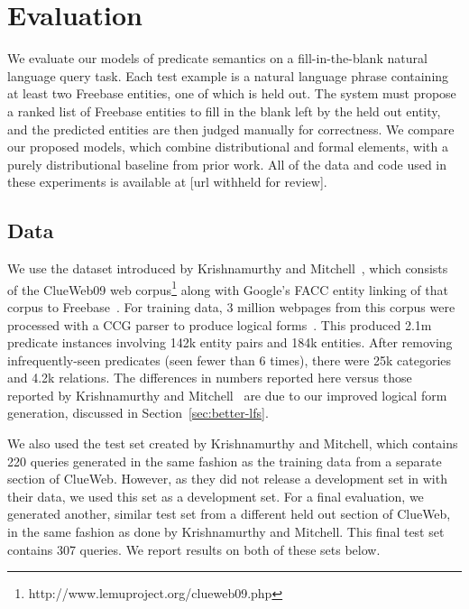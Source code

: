 \documentclass[11pt]{article}
\newcommand{\secref}[1]{Section~\ref{sec:#1}}
\begin{document}
\section{Evaluation}
\label{sec:evaluation}

We evaluate our models of predicate semantics on a fill-in-the-blank
natural language query task.  Each test example is a natural language
phrase containing at least two Freebase entities, one of which is held
out.  The system must propose a ranked list of Freebase entities to
fill in the blank left by the held out entity, and the predicted
entities are then judged manually for correctness.  We compare our
proposed models, which combine distributional and formal elements,
with a purely distributional baseline from prior work.  All of the
data and code used in these experiments is available at [url withheld
for review].

\subsection{Data}

We use the dataset introduced by Krishnamurthy and
Mitchell~,
which consists of the ClueWeb09 web
corpus\footnote{http://www.lemuproject.org/clueweb09.php} along with
Google's FACC entity linking of that corpus to
Freebase~\cite{gabrilovich-2013-clueweb-entity-linking}.  For training
data, 3 million webpages from this corpus were processed with a CCG
parser to produce logical forms~\cite{krishnamurthy-2014-joint-ccg}.
This produced 2.1m predicate instances involving 142k entity pairs and
184k entities.  After removing infrequently-seen predicates (seen
fewer than 6 times), there were 25k categories and 4.2k relations.
The differences in numbers reported here versus those reported by
Krishnamurthy and
Mitchell~ are
due to our improved logical form generation, discussed in
\secref{better-lfs}.

We also used the test set created by Krishnamurthy and Mitchell, which
contains 220 queries generated in the same fashion as the training
data from a separate section of ClueWeb.  However, as they did not
release a development set in with their data, we used this set as a
development set.  For a final evaluation, we generated another,
similar test set from a different held out section of ClueWeb, in the
same fashion as done by Krishnamurthy and Mitchell.  This final test
set contains 307 queries.  We report results on both of these sets
below.
\end{document}
